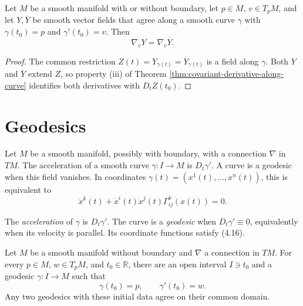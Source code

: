 \begin{proposition}
\label{prop:covariant-derivative-depends-on-curve}
Let $M$ be a smooth manifold with or without boundary, let $p\in M$,
$v\in T_pM$, and let $Y,\overline Y$ be smooth vector fields
that agree along a smooth curve $\gamma$ with $\gamma(t_0)=p$ and
$\gamma'(t_0)=v$. Then
\[
\nabla_vY=\nabla_v\overline Y.
\]
\end{proposition}
\begin{proof}
\sketch The common restriction $Z(t)=Y_{\gamma(t)}=\overline Y_{\gamma(t)}$
is a field along $\gamma$. Both $Y$ and $\overline Y$ extend $Z$, so property
(iii) of Theorem \ref{thm:covariant-derivative-along-curve} identifies both
derivatives with $D_tZ(t_0)$.
\end{proof}
\section{Geodesics}

Let $M$ be a smooth manifold, possibly with boundary, with a connection $\nabla$
in $TM$. The acceleration of a smooth curve $\gamma\colon I\to M$ is
$D_t\gamma'$. A curve is a geodesic when this field vanishes. In coordinates
$\gamma(t)=(x^1(t),\ldots,x^n(t))$, this is equivalent to
\begin{equation}
\ddot x^k(t)+\dot x^i(t)\dot x^j(t)\Gamma^k_{ij}(x(t))=0. \tag{4.16}
\end{equation}

\begin{definition}[Geodesic]
\label{def:geodesic}
\leanok
The \emph{acceleration} of $\gamma$ is $D_t\gamma'$. The curve is a
\emph{geodesic} when $D_t\gamma'\equiv0$, equivalently when its velocity is
parallel. Its coordinate functions satisfy (4.16).
\end{definition}

\begin{theorem}
\label{thm:geodesic-existence-uniqueness}
Let $M$ be a smooth manifold without boundary and $\nabla$ a connection in
$TM$. For every $p\in M$, $w\in T_pM$, and $t_0\in\mathbb R$, there are an open
interval $I\ni t_0$ and a geodesic $\gamma\colon I\to M$ such that
\[
\gamma(t_0)=p,
\qquad \gamma'(t_0)=w.
\]
Any two geodesics with these initial data agree on their common domain.
\end{theorem}

